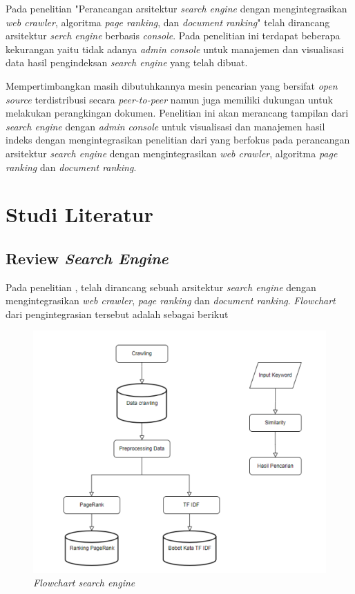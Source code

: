\documentclass[
	a4paper, %
	10pt, %
	unnumberedsections, %
	twoside, %
]{LTJournalArticle}
\begin{document}
Pada penelitian "Perancangan arsitektur \textit{search engine} dengan mengintegrasikan \textit{web crawler}, algoritma \textit{page ranking}, dan \textit{document ranking}" \citep{lazu} telah dirancang arsitektur \textit{serch engine} berbasis \textit{console}. Pada penelitian ini terdapat beberapa kekurangan yaitu tidak adanya \textit{admin console} untuk manajemen dan visualisasi data hasil pengindeksan \textit{search engine} yang telah dibuat.

Mempertimbangkan masih dibutuhkannya mesin pencarian yang bersifat \textit{open source} terdistribusi secara \textit{peer-to-peer} namun juga memiliki dukungan untuk melakukan perangkingan dokumen. Penelitian ini akan merancang tampilan dari \textit{search engine} dengan \textit{admin console} untuk visualisasi dan manajemen hasil indeks dengan mengintegrasikan penelitian dari \cite{lazu} yang berfokus pada perancangan arsitektur \textit{search engine} dengan mengintegrasikan \textit{web crawler}, algoritma \textit{page ranking} dan \textit{document ranking}.


\section{Studi Literatur}

\subsection{Review \textit{Search Engine} \cite{lazu}}

Pada penelitian \cite{lazu}, telah dirancang sebuah arsitektur \textit{search engine} dengan mengintegrasikan \textit{web crawler}, \textit{page ranking} dan \textit{document ranking}. \textit{Flowchart} dari pengintegrasian tersebut adalah sebagai berikut

\begin{figure}[H]
	\includegraphics[width=\linewidth]{flowchart_lazuardy.png}
	\caption{\textit{Flowchart search engine}\cite{lazu}}
	\label{gambar:flowchart_lazu}
\end{figure}
\end{document}
